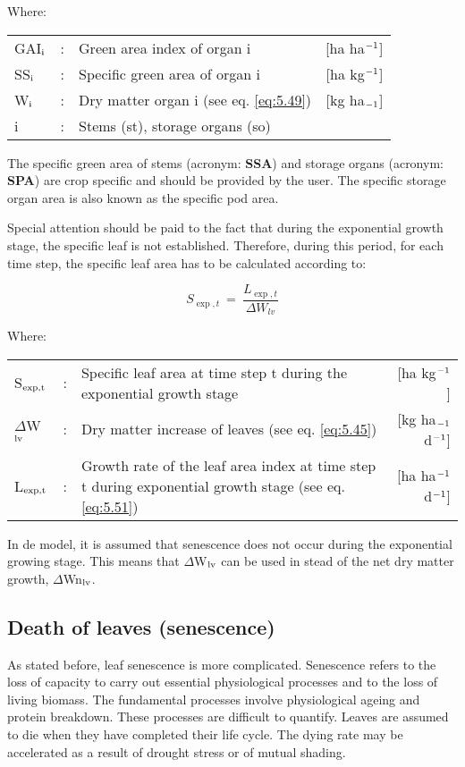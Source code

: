 Where:\\[5pt]
\begin{tabularx}{\textwidth}{llXr}
	GAI$_{{\rm i}}$ &:& Green area index of organ i    &
	[ha ha$^{{\rm -1}}$]\\
	SS$_{{\rm i}}$ &:& Specific green area of organ i    &
	[ha kg$^{{\rm -1}}$]\\
	W$_{{\rm i}}$ &:& Dry matter organ i (see eq. \ref{eq:5.49})    &
	[kg ha$_{{\rm -1}}$]\\
	i &:& Stems (st), storage organs (so)\\
\end{tabularx}

The specific green area of stems (acronym: {\bf SSA}) and storage organs (acronym: {\bf SPA}) are
crop specific and should be provided by the user. The specific storage organ area is also
known as the specific pod area.

Special attention should be paid to the fact that during the exponential growth stage, the
specific leaf is not established. Therefore, during this period, for each time step, the
specific leaf area has to be calculated according to:

\begin{equation}
S_{\exp,t} ~=~ {\frac{L_{\exp,t}}{\Delta W_{lv} }}
\end{equation}

Where:\\[5pt]
\begin{tabularx}{\textwidth}{llXr}
	S$_{{\rm exp,t}}$ &:& Specific leaf area at time step t during the 
	exponential growth stage    &     [ha kg$^{{\rm -1}}$]\\
	$\Delta$W$_{{\rm lv}}$ &:& Dry matter increase of leaves (see eq. \ref{eq:5.45})   &
	[kg ha$_{{\rm -1}}$ d$^{{\rm -1}}$]\\
	L$_{{\rm \exp,t}}$ &:& Growth rate of the leaf area index at time step t
	during exponential growth stage (see eq. \ref{eq:5.51})   &
	[ha ha$^{{\rm -1}}$ d$^{{\rm -1}}$]\\
\end{tabularx}

In de model, it is assumed that senescence does not occur during the exponential growing
stage. This means that $\Delta$W$_{{\rm lv}}$ can be used in stead of the net dry matter 
growth, $\Delta$Wn$_{{\rm lv}}$.

\subsection{Death of leaves (senescence)}
As stated before, leaf senescence is more complicated. Senescence refers to the loss of
capacity to carry out essential physiological processes and to the loss of living biomass.
The fundamental processes involve physiological ageing and protein breakdown. These
processes are difficult to quantify. Leaves are assumed to die when they have completed
their life cycle. The dying rate may be accelerated as a result of drought stress or of
mutual shading.

